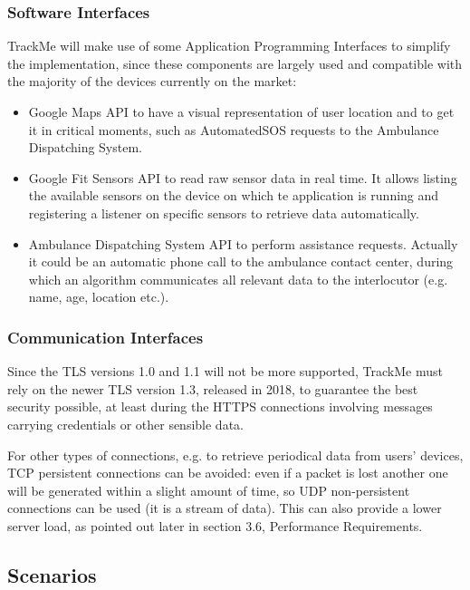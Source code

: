 \documentclass[12pt,a4paper]{article}
\begin{document}
	\subsubsection{Software Interfaces}
		TrackMe will make use of some Application Programming Interfaces to simplify the implementation, since these components are largely used and compatible with the majority of the devices currently on the market:
		\begin{itemize}
			\item Google Maps API to have a visual representation of user location and to get it in critical moments, such as AutomatedSOS requests to the Ambulance Dispatching System.
			\item Google Fit Sensors API to read raw sensor data in real time. It allows listing the available sensors on the device on which te application is running and registering a listener on specific sensors to retrieve data automatically.
			\item Ambulance Dispatching System API to perform assistance requests. Actually it could be an automatic phone call to the ambulance contact center, during which an algorithm communicates all relevant data to the interlocutor (e.g. name, age, location etc.).
		\end{itemize}
	\subsubsection{Communication Interfaces}
		\begin{itemize}
			Since the TLS versions 1.0 and 1.1 will not be more supported, TrackMe must rely on the newer TLS version 1.3, released in 2018, to guarantee the best security possible, at least during the HTTPS connections involving messages carrying credentials or other sensible data. 
			
			For other types of connections, e.g. to retrieve periodical data from users' devices, TCP persistent connections can be avoided: even if a packet is lost another one will be generated within a slight amount of time, so UDP non-persistent connections can be used (it is a stream of data). This can also provide a lower server load, as pointed out later in section 3.6, Performance Requirements.
		\end{itemize}
	
	
	\newpage
	\subsection{Scenarios}
\end{document}
